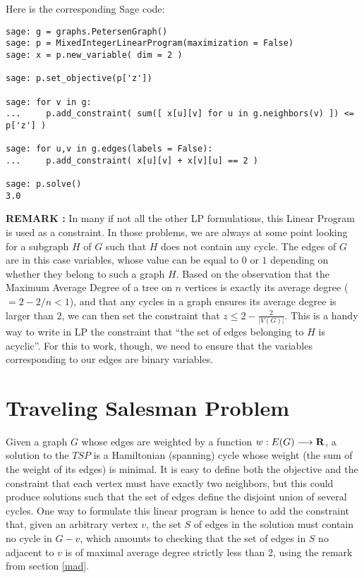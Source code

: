 Here is the corresponding Sage code:

\begin{lstlisting}
sage: g = graphs.PetersenGraph()
sage: p = MixedIntegerLinearProgram(maximization = False)
sage: x = p.new_variable( dim = 2 )

sage: p.set_objective(p['z'])

sage: for v in g:
...     p.add_constraint( sum([ x[u][v] for u in g.neighbors(v) ]) <= p['z'] )

sage: for u,v in g.edges(labels = False):
...     p.add_constraint( x[u][v] + x[v][u] == 2 )

sage: p.solve()
3.0
\end{lstlisting}

{\bf REMARK : } In many if not all the other LP formulations, this Linear Program is used as a constraint. In those problems, we are always at some point looking for a subgraph $H$ of $G$ such that $H$ does not contain any cycle. The edges of $G$ are in this case variables, whose value can be equal to $0$ or $1$ depending on whether they belong to such a graph $H$. Based on the observation that the Maximum Average Degree of a tree on $n$ vertices is exactly its average degree ($=2-2/n<1$), and that any cycles in a graph ensures its average degree is larger than $2$, we can then set the constraint that $z\leq 2-\frac 2 {|V(G)|}$. This is a handy way to write in LP the constraint that ``the set of edges belonging to $H$ is acyclic''. For this to work, though, we need to ensure that the variables corresponding to our edges are binary variables.



\section{Traveling Salesman Problem}
Given a graph $G$ whose edges are weighted by a function $w:E(G) \longrightarrow \mathbf{R}$, a solution to the $TSP$ is a Hamiltonian (spanning) cycle whose weight (the sum of the weight of its edges) is minimal. It is easy to define both the objective and the constraint that each vertex must have exactly two neighbors, but this could produce solutions such that the set of edges define the disjoint union of several cycles. One way to formulate this linear program is hence to add the constraint that, given an arbitrary vertex $v$, the set $S$ of edges in the solution must contain no cycle in $G-v$, which amounts to checking that the set of edges in $S$ no adjacent to $v$ is of maximal average degree strictly less than 2, using the remark from section \ref{mad}.

